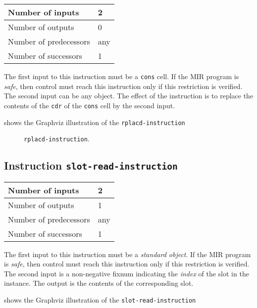 \begin{tabular}{|l|l|}
\hline
Number of inputs & 2\\
\hline
Number of outputs & 0\\
\hline
Number of predecessors & any\\
\hline
Number of successors & 1\\
\hline
\end{tabular}

The first input to this instruction must be a \texttt{cons} cell.  If
the MIR program is \emph{safe}, then control must reach this
instruction only if this restriction is verified.  The second input
can be any object.  The effect of the instruction is to replace the
contents of the \texttt{cdr} of the \texttt{cons} cell by the second
input.

 shows the Graphviz illustration of the
\texttt{rplacd-instruction}

\begin{figure}
\begin{center}
\end{center}
\caption{\label{fig-rplacd-instruction}
\texttt{rplacd-instruction}.}
\end{figure}

\subsection{Instruction \texttt{slot-read-instruction}}
\label{mir-instruction-slot-read}

\begin{tabular}{|l|l|}
\hline
Number of inputs & 2\\
\hline
Number of outputs & 1\\
\hline
Number of predecessors & any\\
\hline
Number of successors & 1\\
\hline
\end{tabular}

The first input to this instruction must be a \emph{standard object}.
If the MIR program is \emph{safe}, then control must reach this
instruction only if this restriction is verified.  The second input is
a non-negative fixnum indicating the \emph{index} of the slot in the
instance.  The output is the contents of the corresponding slot.

 shows the Graphviz illustration of the
\texttt{slot-read-instruction}

